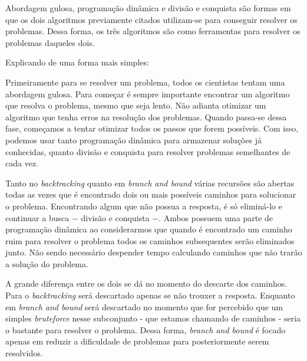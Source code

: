 Abordagem gulosa, programação dinâmica e divisão e conquista são formas em que
os dois algoritmos previamente citados utilizam-se para conseguir resolver os 
problemas. Dessa forma, os três algoritmos são como ferramentas para resolver
os problemas daqueles dois.

Explicando de uma forma mais simples:

Primeiramente para se resolver um problema, todos os cientistas tentam
uma abordagem gulosa. Para começar é sempre importante encontrar um algoritmo
que resolva o problema, mesmo que seja lento. Não adianta otimizar um algoritmo
que tenha erros na resolução dos problemas. 
Quando passa-se dessa fase, começamos a tentar otimizar todos os passos que forem 
possíveis. Com isso, podemos usar tanto programação dinâmica para armazenar
soluções já conhecidas, quanto divisão e conquista para resolver
problemas semelhantes de cada vez.

Tanto no \emph{backtracking} quanto em \emph{branch and bound} várias recursões 
são abertas todas as vezes
que é encontrado dois ou mais possíveis caminhos para solucionar o problema.
Encontrando algum que não possua a resposta, é só eliminá-lo e continuar a busca
$-$ divisão e conquista $-$. Ambos possuem uma parte de programação dinâmica
ao considerarmos que quando é encontrado um caminho ruim para resolver o problema
todos os caminhos subsequentes serão eliminados junto. Não sendo necessário
despender tempo calculando caminhos que não trarão a solução do problema.

A grande diferença entre os dois se dá no momento do descarte dos caminhos.
Para o \emph{backtracking} será descartado apenas se não trouxer a resposta.
Enquanto em \emph{branch and bound} será descartado no momento que for percebido
que um simples \emph{bruteforce} nesse subconjunto - que estamos chamando de 
caminhos - seria o bastante para resolver o problema. Dessa forma,
\emph{branch and bound} é focado apenas em reduzir a dificuldade de problemas
para posteriormente serem resolvidos.